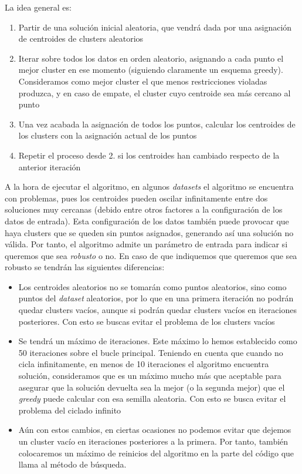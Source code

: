 \documentclass[11pt]{article}
\begin{document}
    La idea general es:

    \begin{enumerate}
        \item Partir de una solución inicial aleatoria, que vendrá dada por una asignación de centroides de clusters aleatorios
        \item Iterar sobre todos los datos en orden aleatorio, asignando a cada punto el mejor cluster en ese momento (siguiendo claramente un esquema greedy). Consideramos como mejor cluster el que menos restricciones violadas produzca, y en caso de empate, el cluster cuyo centroide sea más cercano al punto
        \item Una vez acabada la asignación de todos los puntos, calcular los centroides de los clusters con la asignación actual de los puntos
        \item Repetir el proceso desde 2. si los centroides han cambiado respecto de la anterior iteración
    \end{enumerate}

    A la hora de ejecutar el algoritmo, en algunos \emph{datasets} el algoritmo se encuentra con problemas, pues los centroides pueden oscilar infinitamente entre dos soluciones muy cercanas (debido entre otros factores a la configuración de los datos de entrada). Esta configuración de los datos también puede provocar que haya clusters que se queden sin puntos asignados, generando así una solución no válida. Por tanto, el algoritmo admite un parámetro de entrada para indicar si queremos que sea \emph{robusto} o no. En caso de que indiquemos que queremos que sea robusto se tendrán las siguientes diferencias:

    \begin{itemize}
        \item Los centroides aleatorios no se tomarán como puntos aleatorios, sino como puntos del \emph{dataset} aleatorios, por lo que en una primera iteración no podrán quedar clusters vacíos, aunque si podrán quedar clusters vacíos en iteraciones posteriores. Con esto se buscas evitar el problema de los clusters vacíos
        \item Se tendrá un máximo de iteraciones. Este máximo lo hemos establecido como 50 iteraciones sobre el bucle principal. Teniendo en cuenta que cuando no cicla infinitamente, en menos de 10 iteraciones el algoritmo encuentra solución, consideramos que es un máximo mucho más que aceptable para asegurar que la solución devuelta sea la mejor (o la segunda mejor) que el \emph{greedy} puede calcular con esa semilla aleatoria. Con esto se busca evitar el problema del ciclado infinito
        \item Aún con estos cambios, en ciertas ocasiones no podemos evitar que dejemos un cluster vacío en iteraciones posteriores a la primera. Por tanto, también colocaremos un máximo de reinicios del algoritmo en la parte del código que llama al método de búsqueda.
    \end{itemize}
\end{document}
